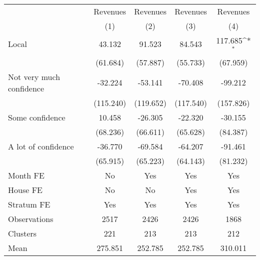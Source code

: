 {
\def\sym#1{\ifmmode^{#1}\else\(^{#1}\)\fi}
\begin{tabular}{l*{4}{c}}
\toprule
                &\multicolumn{1}{c}{Revenues}&\multicolumn{1}{c}{Revenues}&\multicolumn{1}{c}{Revenues}&\multicolumn{1}{c}{Revenues}\\
                &\multicolumn{1}{c}{(1)}         &\multicolumn{1}{c}{(2)}         &\multicolumn{1}{c}{(3)}         &\multicolumn{1}{c}{(4)}         \\
\midrule
Local           &   43.132         &   91.523         &   84.543         &  117.685\sym{*}  \\
                & (61.684)         & (57.887)         & (55.733)         & (67.959)         \\
Not very much confidence&  -32.224         &  -53.141         &  -70.408         &  -99.212         \\
                &(115.240)         &(119.652)         &(117.540)         &(157.826)         \\
Some confidence &   10.458         &  -26.305         &  -22.320         &  -30.155         \\
                & (68.236)         & (66.611)         & (65.628)         & (84.387)         \\
A lot of confidence&  -36.770         &  -69.584         &  -64.207         &  -91.461         \\
                & (65.915)         & (65.223)         & (64.143)         & (81.232)         \\
Month FE        &       No         &      Yes         &      Yes         &      Yes         \\
House FE        &       No         &       No         &      Yes         &      Yes         \\
Stratum FE      &      Yes         &      Yes         &      Yes         &      Yes         \\
\midrule
Observations    &     2517         &     2426         &     2426         &     1868         \\
Clusters        &      221         &      213         &      213         &      212         \\
Mean            &  275.851         &  252.785         &  252.785         &  310.011         \\
\bottomrule
\end{tabular}
}
